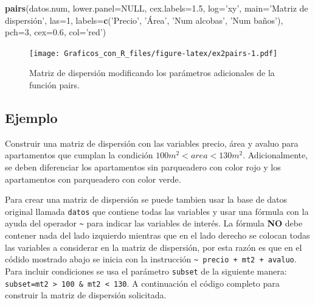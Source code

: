\documentclass[10pt,]{krantz}
\makeatletter
\newenvironment{Shaded}{\begin{snugshade}}{\end{snugshade}}
\newcommand{\KeywordTok}[1]{\textcolor[rgb]{0.13,0.29,0.53}{\textbf{{#1}}}}
\newcommand{\DataTypeTok}[1]{\textcolor[rgb]{0.13,0.29,0.53}{{#1}}}
\newcommand{\DecValTok}[1]{\textcolor[rgb]{0.00,0.00,0.81}{{#1}}}
\newcommand{\FloatTok}[1]{\textcolor[rgb]{0.00,0.00,0.81}{{#1}}}
\newcommand{\StringTok}[1]{\textcolor[rgb]{0.31,0.60,0.02}{{#1}}}
\newcommand{\OtherTok}[1]{\textcolor[rgb]{0.56,0.35,0.01}{{#1}}}
\newcommand{\NormalTok}[1]{{#1}}
\newenvironment{kframe}{%
\medskip{}
\setlength{\fboxsep}{.8em}
 \def\at@end@of@kframe{}%
 \ifinner\ifhmode%
  \def\at@end@of@kframe{\end{minipage}}%
  \begin{minipage}{\columnwidth}%
 \fi\fi%
 \def\FrameCommand##1{\hskip\@totalleftmargin \hskip-\fboxsep
 \colorbox{shadecolor}{##1}\hskip-\fboxsep
     \hskip-\linewidth \hskip-\@totalleftmargin \hskip\columnwidth}%
 \MakeFramed {\advance\hsize-\width
   \@totalleftmargin\z@ \linewidth\hsize
   \@setminipage}}%
 {\par\unskip\endMakeFramed%
 \at@end@of@kframe}
\renewenvironment{Shaded}{\begin{kframe}}{\end{kframe}}
\makeatother
\begin{document}
\begin{Shaded}
\begin{Highlighting}[]
\KeywordTok{pairs}\NormalTok{(datos.num, }\DataTypeTok{lower.panel=}\OtherTok{NULL}\NormalTok{, }\DataTypeTok{cex.labels=}\FloatTok{1.5}\NormalTok{, }\DataTypeTok{log=}\StringTok{'xy'}\NormalTok{,}
      \DataTypeTok{main=}\StringTok{'Matriz de dispersión'}\NormalTok{, }\DataTypeTok{las=}\DecValTok{1}\NormalTok{,}
      \DataTypeTok{labels=}\KeywordTok{c}\NormalTok{(}\StringTok{'Precio'}\NormalTok{, }\StringTok{'Área'}\NormalTok{, }\StringTok{'Num alcobas'}\NormalTok{, }\StringTok{'Num baños'}\NormalTok{),}
      \DataTypeTok{pch=}\DecValTok{3}\NormalTok{, }\DataTypeTok{cex=}\FloatTok{0.6}\NormalTok{, }\DataTypeTok{col=}\StringTok{'red'}\NormalTok{)}
\end{Highlighting}
\end{Shaded}

\begin{figure}[htbp]
\centering
\texttt{[image: Graficos\_con\_R\_files/figure-latex/ex2pairs-1.pdf]}
\caption{\label{fig:ex2pairs}Matriz de dispersión modificando los parámetros
adicionales de la función pairs.}
\end{figure}

\subsection*{Ejemplo}\label{ejemplo-12}


Construir una matriz de dispersión con las variables precio, área y
avaluo para apartamentos que cumplan la condición
\(100 m^2 < area < 130 m^2\). Adicionalmente, se deben diferenciar los
apartamentos sin parqueadero con color rojo y los apartamentos con
parqueadero con color verde.

Para crear una matriz de dispersión se puede tambien usar la base de
datos original llamada \texttt{datos} que contiene todas las variables y
usar una fórmula con la ayuda del operador \texttt{\textasciitilde{}}
para indicar las variables de interés. La fórmula \textbf{NO} debe
contener nada del lado izquierdo mientras que en el lado derecho se
colocan todas las variables a considerar en la matriz de dispersión, por
esta razón es que en el códido mostrado abajo se inicia con la
instrucción \texttt{\textasciitilde{}\ precio\ +\ mt2\ +\ avaluo}. Para
incluir condiciones se usa el parámetro \texttt{subset} de la siguiente
manera:
\texttt{subset=mt2\ \textgreater{}\ 100\ \&\ mt2\ \textless{}\ 130}. A
continuación el código completo para construir la matriz de dispersión
solicitada.
\end{document}
